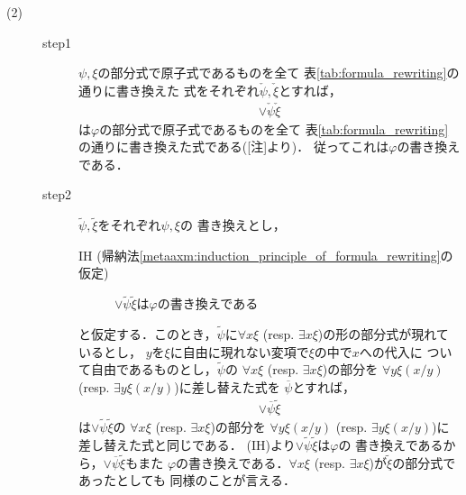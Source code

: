 \begin{metaprf}
\begin{description}
			\item[(2)]		
				\begin{description}
					\item[step1]
						$\psi,\xi$の部分式で原子式であるものを全て
						表\ref{tab:formula_rewriting}の通りに書き換えた
						式をそれぞれ$\check{\psi},\check{\xi}$とすれば，
						\begin{align}
							\vee \check{\psi} \check{\xi}
						\end{align}
						は$\varphi$の部分式で原子式であるものを全て
						表\ref{tab:formula_rewriting}の通りに書き換えた式である([注]より)．
						従ってこれは$\varphi$の書き換えである．
								
					\item[step2]
						$\widetilde{\psi},\widetilde{\xi}$をそれぞれ$\psi,\xi$の
						書き換えとし，
						\begin{description}
							\item[IH (帰納法\ref{metaaxm:induction_principle_of_formula_rewriting}の仮定)]
								$\vee \widetilde{\psi} \widetilde{\xi}$は$\varphi$の書き換えである
						\end{description}
						と仮定する．このとき，$\widetilde{\psi}$に$\forall x \xi$ 
						(resp. $\exists x \xi$)の形の部分式が現れているとし，
						$y$を$\xi$に自由に現れない変項で$\xi$の中で$x$への代入に
						ついて自由であるものとし，$\widetilde{\psi}$の
						$\forall x \xi$ (resp. $\exists x \xi$)の部分を
						$\forall y \xi(x/y)$
						(resp. $\exists y \xi(x/y)$)に差し替えた式を
						$\overline{\psi}$とすれば，
						\begin{align}
							\vee \overline{\psi} \widetilde{\xi}
						\end{align}
						は$\vee \widetilde{\psi} \widetilde{\xi}$の
						$\forall x \xi$ (resp. $\exists x \xi$)の部分を
						$\forall y \xi(x/y)$
						(resp. $\exists y \xi(x/y)$)に差し替えた式と同じである．
						(IH)より$\vee \widetilde{\psi} \widetilde{\xi}$は$\varphi$の
						書き換えであるから，$\vee \overline{\psi} \widetilde{\xi}$もまた
						$\varphi$の書き換えである．$\forall x \xi$ 
						(resp. $\exists x \xi$)が$\widetilde{\xi}$の部分式であったとしても
						同様のことが言える．
						\QED
				\end{description}
		\end{description}
	\end{metaprf}
	
